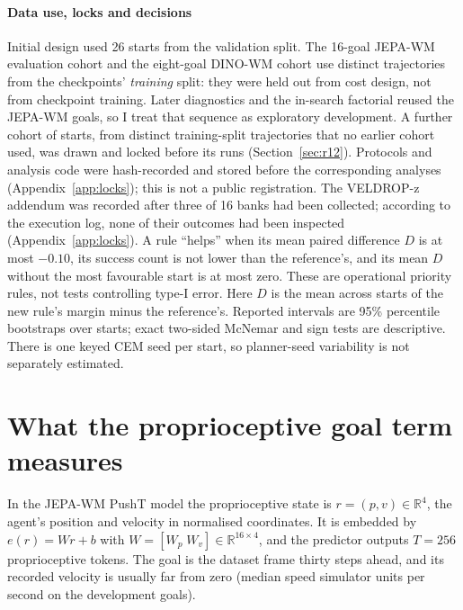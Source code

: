 \paragraph{Data use, locks and decisions} Initial design used 26 starts from the validation split. The 16-goal JEPA-WM
evaluation cohort and the eight-goal DINO-WM cohort use distinct trajectories from the checkpoints' \emph{training}
split: they were held out from cost design, not from checkpoint training. Later diagnostics and the in-search factorial
reused the JEPA-WM goals, so I treat that sequence as exploratory development. A further cohort of \RTwN{} starts, from
distinct training-split trajectories that no earlier cohort used, was drawn and locked before its runs
(Section~\ref{sec:r12}). Protocols and analysis code were hash-recorded and stored before the corresponding analyses
(Appendix~\ref{app:locks}); this is not a public registration. The VELDROP-z addendum was recorded after three of 16 banks had been
collected; according to the execution log, none of their outcomes had been inspected (Appendix~\ref{app:locks}). A rule
``helps'' when its mean paired difference $D$ is at most $-0.10$, its success count is not lower than the reference's,
and its mean $D$ without the most favourable start is at most zero. These are operational priority rules, not tests
controlling type-I error. Here $D$ is the mean across starts of the new rule's margin minus the reference's. Reported intervals are 95\% percentile bootstraps over starts; exact two-sided McNemar and sign tests are
descriptive. There is one keyed CEM seed per start, so planner-seed variability is not separately estimated.

\section{What the proprioceptive goal term measures}
\label{sec:audit}
In the JEPA-WM PushT model the proprioceptive state is $r=(p,v)\in\mathbb{R}^4$, the agent's position and velocity in
normalised coordinates. It is embedded by $e(r)=Wr+b$ with $W=[W_p\;W_v]\in\mathbb{R}^{16\times4}$, and the predictor
outputs $T=256$ proprioceptive tokens. The goal is the dataset frame thirty steps ahead, and its recorded velocity is
usually far from zero (median speed \DevGoalSpeed{} simulator units per second on the development goals).

